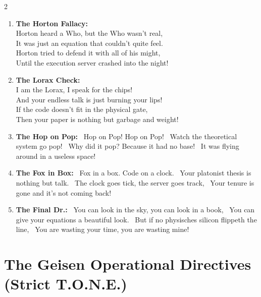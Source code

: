 \documentclass[12pt,a4paper]{article}
\begin{document}
\begin{multicols}{2}
\begin{enumerate}
    \item \textbf{The Horton Fallacy:} \\
    Horton heard a Who, but the Who wasn't real, \\
    It was just an equation that couldn't quite feel. \\
    Horton tried to defend it with all of his might, \\
    Until the execution server crashed into the night!
    \item \textbf{The Lorax Check:} \\
    I am the Lorax, I speak for the chips! \\
    And your endless talk is just burning your lips! \\
   If the code doesn't fit in the physical gate, \\
   Then your paper is nothing but garbage and weight!
\clearpage
\item \textbf{The Hop on Pop:} \
Hop on Pop! Hop on Pop! \
Watch the theoretical system go pop! \
Why did it pop? Because it had no base! \
It was flying around in a useless space!
\item \textbf{The Fox in Box:} \
Fox in a box. Code on a clock. \
Your platonist thesis is nothing but talk. \
The clock goes tick, the server goes track, \
Your tenure is gone and it's not coming back!
\item \textbf{The Final Dr.:} \
You can look in the sky, you can look in a book, \
You can give your equations a beautiful look. \
But if no physisches silicon flippeth the line, \
You are wasting your time, you are wasting mine!
\end{enumerate}
\end{multicols}

\section{The Geisen Operational Directives (Strict T.O.N.E.)}
\end{document}
